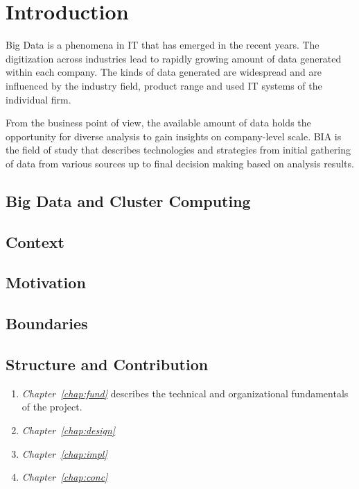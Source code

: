 \chapter{Introduction}
\label{chap:intro}

Big Data is a phenomena in \ac{IT} that has emerged in the recent years.
The digitization across industries lead to rapidly growing amount of data generated
within each company.
The kinds of data generated are widespread 
and are influenced by the industry field, product range and used \ac{IT} systems 
of the individual firm.

From the business point of view, the available amount of data 
holds the opportunity for diverse analysis to gain insights on company-level scale.
\ac{BIA} is the field of study that describes technologies and strategies 
from initial gathering of data from various sources 
up to final decision making based on analysis results.    

\section{Big Data and Cluster Computing}
\label{sec:intro:cluster}


\section{Context}
\label{sec:intro:context}

\section{Motivation}
\label{sec:intro:motivation}

\section{Boundaries}
\label{sec:intro:boundaries}

\section{Structure and Contribution}
\label{sec:intro:structure}


\begin{enumerate}
    \item \emph{Chapter~\vref{chap:fund}} describes the technical and organizational fundamentals of the project. 
    \item \emph{Chapter~\vref{chap:design}}
    \item \emph{Chapter~\vref{chap:impl}}
    \item \emph{Chapter~\vref{chap:conc}}
\end{enumerate}

